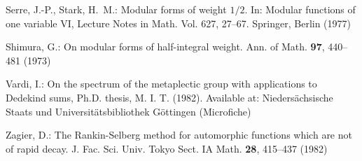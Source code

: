 \documentclass[leqno,10pt]{amsart}
\theoremstyle{plain}
\numberwithin{equation}{section}
\theoremstyle{definition}
\theoremstyle{remark}
\begin{document}
\begin{thebibliography}{}
 Serre, J.-P., Stark, H.~M.: Modular forms of weight $1/2$. In: Modular functions of one variable VI, Lecture Notes in Math. Vol. 627, 27--67. Springer, Berlin (1977)

 Shimura, G.: On modular forms of half-integral weight. Ann. of Math. {\bf 97}, 440--481 (1973)
%

 Vardi, I.: On the spectrum of the metaplectic group with applications to Dedekind sums, Ph.D. thesis, M. I. T. (1982). Available at: Nieders\"achsische Staats und Universit\"atsbibliothek G\"ottingen (Microfiche)

 Zagier, D.: The Rankin-Selberg method for automorphic functions which are not of rapid decay. J. Fac. Sci. Univ. Tokyo Sect. IA Math.  {\bf 28},  415--437 (1982)
       

\end{thebibliography}
\end{document}
